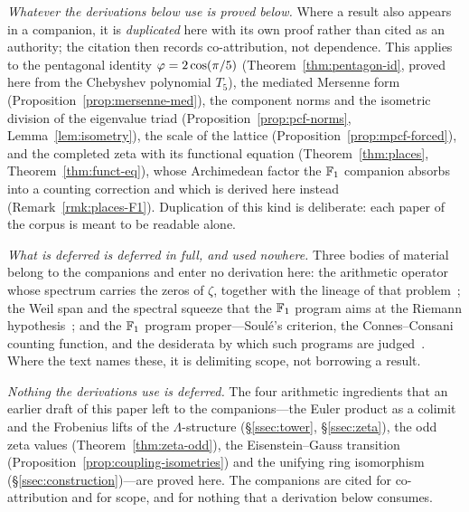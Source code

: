 \emph{Whatever the derivations below use is proved below.} Where a result also appears in a
companion, it is \emph{duplicated} here with its own proof rather than cited as an authority; the
citation then records co-attribution, not dependence. This applies to the pentagonal identity
$\varphi=2\cos(\pi/5)$ (Theorem~\ref{thm:pentagon-id}, proved here from the Chebyshev polynomial
$T_5$), the mediated Mersenne form (Proposition~\ref{prop:mersenne-med}), the component norms and
the isometric division of the eigenvalue triad (Proposition~\ref{prop:pcf-norms},
Lemma~\ref{lem:isometry}), the scale of the lattice (Proposition~\ref{prop:mpcf-forced}), and the
completed zeta with its functional equation (Theorem~\ref{thm:places},
Theorem~\ref{thm:funct-eq}), whose Archimedean factor the $\mathbb{F}_1$ companion absorbs into a counting
correction and which is derived here instead
(Remark~\ref{rmk:places-F1}). Duplication of this kind is deliberate: each paper of the corpus is
meant to be readable alone.

\emph{What is deferred is deferred in full, and used nowhere.} Three bodies of material belong to
the companions and enter no derivation here: the arithmetic operator whose spectrum carries the
zeros of $\zeta$, together with the lineage of that problem~\cite{HP}; the Weil span and the
spectral squeeze that the $\mathbb{F}_1$ program aims at the Riemann hypothesis~\cite{F1}; and the $\mathbb{F}_1$
program proper---Soul\'e's criterion, the Connes--Consani counting function, and the desiderata by
which such programs are judged~\cite{F1}. Where the text names these, it is delimiting scope, not
borrowing a result.

\emph{Nothing the derivations use is deferred.} The four arithmetic ingredients that an earlier
draft of this paper left to the companions---the Euler product as a colimit and the Frobenius
lifts of the $\Lambda$-structure (\S\ref{ssec:tower}, \S\ref{ssec:zeta}), the odd zeta values
(Theorem~\ref{thm:zeta-odd}), the Eisenstein--Gauss transition
(Proposition~\ref{prop:coupling-isometries}) and the unifying ring isomorphism
(\S\ref{ssec:construction})---are proved here. The companions are cited for co-attribution and for
scope, and for nothing that a derivation below consumes.







